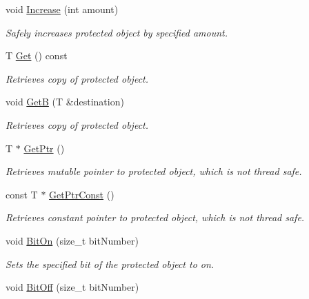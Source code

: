 \begin{DoxyCompactItemize}
void \hyperlink{class_concurrent_object_aa144f004cedf93c76d28c992a0ae9026}{Increase} (int amount)
\begin{DoxyCompactList}\small\item\em Safely increases protected object by specified amount. \item\end{DoxyCompactList}\item 
T \hyperlink{class_concurrent_object_a671350eedb2a56a14c4f10023d7b4ae9}{Get} () const 
\begin{DoxyCompactList}\small\item\em Retrieves copy of protected object. \item\end{DoxyCompactList}\item 
void \hyperlink{class_concurrent_object_a2e40c00b19595d7816ff3e8020b1594d}{GetB} (T \&destination)
\begin{DoxyCompactList}\small\item\em Retrieves copy of protected object. \item\end{DoxyCompactList}\item 
T $\ast$ \hyperlink{class_concurrent_object_a1ef50fdbaf6004708adfd80aa54f4dd6}{GetPtr} ()
\begin{DoxyCompactList}\small\item\em Retrieves mutable pointer to protected object, which is not thread safe. \item\end{DoxyCompactList}\item 
const T $\ast$ \hyperlink{class_concurrent_object_a6cd29463e8fbdb1ec7bcb7df6fc5a598}{GetPtrConst} ()
\begin{DoxyCompactList}\small\item\em Retrieves constant pointer to protected object, which is not thread safe. \item\end{DoxyCompactList}\item 
void \hyperlink{class_concurrent_object_afcaf1c2ecea8ff0b58db40194e1424ef}{BitOn} (size\_\-t bitNumber)
\begin{DoxyCompactList}\small\item\em Sets the specified bit of the protected object to on. \item\end{DoxyCompactList}\item 
void \hyperlink{class_concurrent_object_a97cf35fb4e3e7b59b3a7b83f7aaad5cb}{BitOff} (size\_\-t bitNumber)

\end{DoxyCompactItemize}
